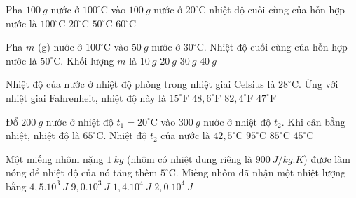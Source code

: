 \begin{ex}%
	Pha $100\ g$ nước ở $100^\circ\text{C}$ vào $100\ g$ nước ở $20^\circ\text{C}$ nhiệt độ cuối cùng của hỗn hợp nước là
	\choice
	{$100^\circ\text{C}$}
	{$20^\circ\text{C}$}
	{$50^\circ\text{C}$}
	{\True $60^\circ\text{C}$}
\end{ex}

\begin{ex}%
	Pha $m$ (g) nước ở $100^\circ\text{C}$ vào $50\ g$ nước ở $30^\circ\text{C}$. Nhiệt độ cuối cùng của hỗn hợp nước là $50^\circ\text{C}$. Khối lượng $m$ là
	\choice
	{$10\ g$}
	{\True $20\ g$}
	{$30\ g$}
	{$40\ g$}
\end{ex}

\begin{ex}%
	Nhiệt độ của nước ở nhiệt độ phòng trong nhiệt giai Celsius là $28^\circ\text{C}$. Ứng với nhiệt giai Fahrenheit, nhiệt độ này là
	\choice
	{$15^\circ\text{F}$}
	{$48,6^\circ\text{F}$}
	{\True $82,4^\circ\text{F}$}
	{$47^\circ\text{F}$}
\end{ex}

\begin{ex}%
	Đổ $200\ g$ nước ở nhiệt độ $t_1=20^\circ\text{C}$ vào $300\ g$ nước ở nhiệt độ $t_2$. Khi cân bằng nhiệt, nhiệt độ là $65^\circ\text{C}$. Nhiệt độ $t_2$ của nước là
	\choice
	{$42,5^\circ\text{C}$}
	{\True $95^\circ\text{C}$}
	{$85^\circ\text{C}$}
	{$45^\circ\text{C}$}
\end{ex}

\begin{ex}%
	Một miếng nhôm nặng $1\ kg$ (nhôm có nhiệt dung riêng là $900\ J/kg.K$) được làm nóng để nhiệt độ của nó tăng thêm $5^\circ\text{C}$. Miếng nhôm đã nhận một nhiệt lượng bằng
	\choice
	{\True $4,5.10^3\ J$}
	{$9,0.10^3\ J$}
	{$1,4.10^4\ J$}
	{$2,0.10^4\ J$}
\end{ex}


